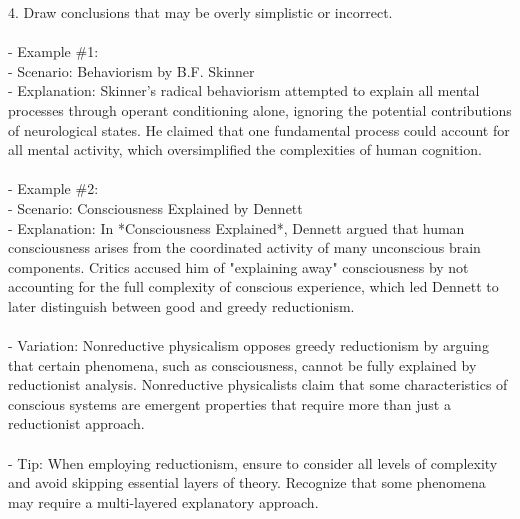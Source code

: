 \documentclass[a4paper,12pt,single,pdftex]{scrbook}
\begin{document}
    
        4. Draw conclusions that may be overly simplistic or incorrect.
    \\

    
      
    \\

    
      - Example \#1:
    \\

    
        - Scenario: Behaviorism by B.F. Skinner
    \\

    
        - Explanation: Skinner's radical behaviorism attempted to explain all mental processes through operant conditioning alone, ignoring the potential contributions of neurological states. He claimed that one fundamental process could account for all mental activity, which oversimplified the complexities of human cognition.
    \\

    
      
    \\

    
      - Example \#2:
    \\

    
        - Scenario: Consciousness Explained by Dennett
    \\

    
        - Explanation: In *Consciousness Explained*, Dennett argued that human consciousness arises from the coordinated activity of many unconscious brain components. Critics accused him of "explaining away" consciousness by not accounting for the full complexity of conscious experience, which led Dennett to later distinguish between good and greedy reductionism.
    \\

    
      
    \\

    
      - Variation: Nonreductive physicalism opposes greedy reductionism by arguing that certain phenomena, such as consciousness, cannot be fully explained by reductionist analysis. Nonreductive physicalists claim that some characteristics of conscious systems are emergent properties that require more than just a reductionist approach.
    \\

    
      
    \\

    
      - Tip: When employing reductionism, ensure to consider all levels of complexity and avoid skipping essential layers of theory. Recognize that some phenomena may require a multi-layered explanatory approach.
    \\
\end{document}
